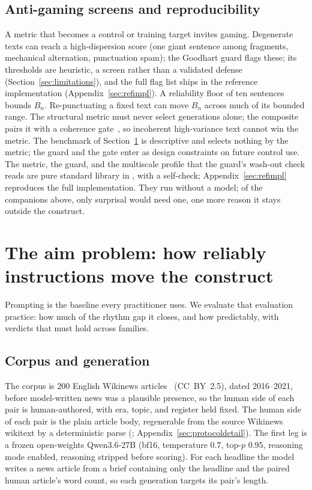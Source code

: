 \documentclass{article}
\begin{document}
\subsection{Anti-gaming screens and reproducibility}
A metric that becomes a control or training target invites gaming. Degenerate texts can reach a
high-dispersion score (one giant sentence among fragments, mechanical alternation, punctuation spam);
the Goodhart guard flags these; its thresholds are heuristic, a screen rather than a validated
defense (Section~\ref{sec:limitations}), and the full flag list ships in the reference
implementation (Appendix~\ref{sec:refimpl}). A reliability floor of ten sentences bounds $B_n$. Re-punctuating a
fixed text can move $B_n$ across much of its bounded range. The structural metric must never select
generations alone; the composite pairs it with a coherence gate~\citep{arxiv2025evaluating}, so
incoherent high-variance text cannot win the metric. The benchmark of
Section~\ref{sec:promptceiling} is descriptive and selects nothing by the metric; the guard and the
gate enter as design constraints on future control use.
The metric, the guard, and the multiscale profile that the guard's wash-out check reads are pure standard library in
, with a self-check; Appendix~\ref{sec:refimpl} reproduces the full implementation. They run without a model; of the
companions above, only surprisal would need one, one more reason it stays
outside the construct.

\section{The aim problem: how reliably instructions move the construct}
\label{sec:promptceiling}

Prompting is the baseline every practitioner uses. We evaluate that
evaluation practice: how much of the rhythm gap it closes, and how
predictably, with verdicts that must hold across families.

\subsection{Corpus and generation}
\label{sec:corpus}
The corpus is $200$ English Wikinews articles~\citep{wikinews2021wikinews}
(CC~BY~2.5), dated 2016--2021, before model-written news was a plausible
presence, so the human side of each pair is human-authored, with era,
topic, and register held fixed. The human side
of each pair is the plain article body, regenerable from the source Wikinews
wikitext by a deterministic parse
(; Appendix~\ref{sec:protocoldetail}).
The first leg is
a frozen open-weights Qwen3.6-27B (bf16, temperature $0.7$, top-$p$ $0.95$,
reasoning mode enabled, reasoning stripped before scoring). For each headline the model writes
a news article from a brief containing only the headline and the paired human
article's word count, so each generation targets its pair's length.
\end{document}
